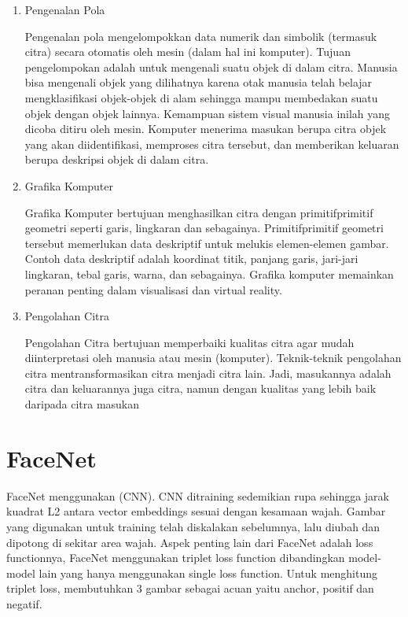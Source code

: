 \begin{enumerate}
  \item Pengenalan Pola
    
  Pengenalan pola mengelompokkan data numerik dan simbolik (termasuk citra) secara otomatis oleh mesin (dalam hal ini
  komputer). Tujuan pengelompokan adalah untuk mengenali
  suatu objek di dalam citra. Manusia bisa mengenali objek
  yang dilihatnya karena otak manusia telah belajar mengklasifikasi objek-objek di alam sehingga mampu membedakan suatu objek dengan objek lainnya. Kemampuan sistem visual
  manusia inilah yang dicoba ditiru oleh mesin. Komputer menerima masukan berupa citra objek yang akan diidentifikasi,
  memproses citra tersebut, dan memberikan keluaran berupa
  deskripsi objek di dalam citra.

  \item Grafika Komputer
  
  Grafika Komputer bertujuan menghasilkan citra dengan primitifprimitif geometri seperti garis, lingkaran dan sebagainya. Primitifprimitif geometri tersebut memerlukan data deskriptif untuk
  melukis elemen-elemen gambar. Contoh data deskriptif adalah koordinat titik, panjang garis, jari-jari lingkaran, tebal
  garis, warna, dan sebagainya. Grafika komputer memainkan
  peranan penting dalam visualisasi dan virtual reality.

  \item Pengolahan Citra
    
  Pengolahan Citra bertujuan memperbaiki kualitas citra agar
  mudah diinterpretasi oleh manusia atau mesin (komputer).
  Teknik-teknik pengolahan citra mentransformasikan citra menjadi citra lain. Jadi, masukannya adalah citra dan keluarannya
  juga citra, namun dengan kualitas yang lebih baik daripada
  citra masukan
\end{enumerate}

\section{FaceNet}
FaceNet menggunakan (CNN). CNN ditraining sedemikian rupa sehingga jarak kuadrat L2 antara vector embeddings sesuai dengan kesamaan wajah.
Gambar yang digunakan untuk training telah diskalakan sebelumnya, lalu diubah dan dipotong di sekitar area wajah.
Aspek penting lain dari FaceNet adalah loss functionnya, FaceNet menggunakan triplet loss function dibandingkan model-model lain yang hanya menggunakan single loss function.
Untuk menghitung triplet loss, membutuhkan 3 gambar sebagai acuan yaitu anchor, positif dan negatif\citep{Facenet2015}.

